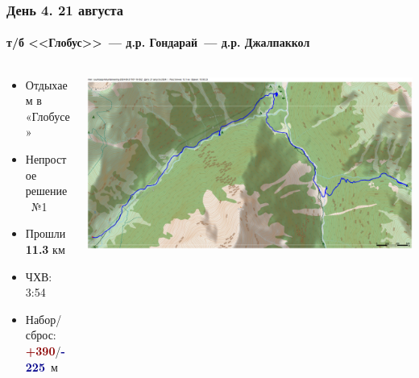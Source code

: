 	\begin{frame}
	\frametitle{День 4. 21 августа}
	\framesubtitle{ т/б <<Глобус>>~--- д.р. Гондарай~--- д.р. Джалпаккол} %
	\begin{columns}[c] %
		\begin{column}{0.45\textwidth} %
			\begin{itemize}
				\item Отдыхаем в «Глобусе»
				\item Непростое решение\texttrademark~№1
				\item Прошли \textbf{11.3} км
				\item ЧХВ: 3:54
				\item Набор/сброс: \textcolor{darkred}{\textbf{+390}}/\textcolor{darkblue}{\textbf{-225}}~м
			\end{itemize}
			
		\end{column}
		\begin{column}{0.5\textwidth} %
			\centering
			\includegraphics[width=\linewidth]{../pics/mini_maps/21}
		\end{column}
	\end{columns}
\end{frame}

